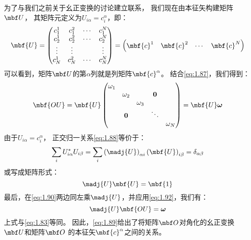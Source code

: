 为了与我们之前关于幺正变换的讨论建立联系，
我们现在由本征矢构建矩阵$\mbf U$，
其矩阵元定义为$U_{i\alpha} = c_i^\alpha$，即：
\begin{equation}
 \mbf{U} = \begin{pmatrix}
     c_1^1     &c_1^2     &\cdots &c_1^N \\
     c_2^1     &c_2^2     &\cdots &c_2^N \\
     \vdots &\vdots &                &\vdots\\
     c_N^1     &c_N^2     &\cdots &c_N^N
 \end{pmatrix} = \begin{pmatrix}
     \mbf{c}^1 &\mbf{c}^2 &\cdots &\mbf{c}^N
 \end{pmatrix}
 \label{eq:1.89}
\end{equation}
可以看到，矩阵$\mbf U$的第$\alpha$列就是列矩阵$\mbf{c}^\alpha$。
结合\autoref{eq:1.87}，我们得到：
\begin{equation}
 \mbf{OU} = \mbf{U} \begin{pmatrix}
     \omega_1     & & & &\\
          &\omega_2 &     &\mathbf{0} &\\
          & &\omega_3 & &\\
          &\mathbf{0} & & \ddots & \\
          & &     & &\omega_N
 \end{pmatrix} = \mbf{U}\boldsymbol\omega
 \label{eq:1.90}
\end{equation}
由于$U_{i\alpha} = c_i^\alpha$，
正交归一关系\autoref{eq:1.88}等价于：
\begin{equation}
 \sum_i U_{i\alpha}^\ast U_{i\beta} = \sum_i \left(\madj{U}\right)_{\alpha i}\left(\mbf{U}\right)_{i\beta} = \delta_{\alpha\beta}
 \label{eq:1.91}
\end{equation}
或写成矩阵形式：
\begin{equation}
 \madj{U}\mbf{U} = \mbf{1}
 \label{eq:1.92}
\end{equation}
最后，在\autoref{eq:1.90}两边同左乘$\madj{U}$，并应用\autoref{eq:1.92}，我们有：
\begin{equation}
 \madj{U}\mbf{OU} = \boldsymbol\omega
 \label{eq:1.93}
\end{equation}
上式与\autoref{eq:1.83}等同。
因此，\autoref{eq:1.89}给出了将矩阵$\mbf O$对角化的幺正变换$\mbf U$和矩阵$\mbf O$ 的本征矢$\mbf{c}^\alpha$之间的关系。


